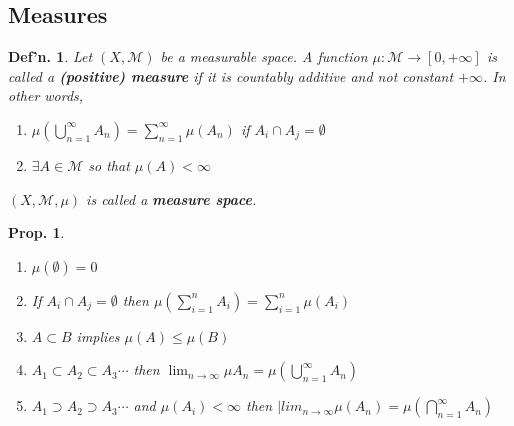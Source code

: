 \documentclass[12pt, a4paper]{book}
\newtheorem{definition}[theorem]{Def'n.}
\newtheorem{proposition}[theorem]{Prop.}
\theoremstyle{nonumberplain}
\begin{document}
\subsection{Measures}
\begin{definition}
    Let $(X,\mathcal{M})$ be a measurable space.
    A function $\mu:\mathcal{M}\to[0,+\infty]$ is called a \textbf{(positive) measure} if it is countably additive and not constant $+\infty$.
    In other words,
    \begin{enumerate}
        \item $\mu\left(\bigcup\limits_{n=1}^\infty A_n\right)=\sum\limits_{n=1}^\infty \mu(A_n)$ if $A_i\cap A_j=\emptyset$
        \item $\exists A\in\mathcal{M}$ so that $\mu(A)<\infty$
    \end{enumerate}
    $(X,\mathcal{M},\mu)$ is called a \textbf{measure space}.
\end{definition}
\begin{proposition}
    \begin{enumerate}[nolistsep]
        \item $\mu(\emptyset)=0$
        \item If $A_i\cap A_j=\emptyset$ then $\mu\left(\sum\limits_{i=1}^n A_i\right)=\sum\limits_{i=1}^n\mu(A_i)$
        \item $A\subset B$ implies $\mu(A)\leq\mu(B)$
        \item $A_1\subset A_2\subset A_3\cdots$ then $\lim_{n\to\infty}\mu A_n=\mu\left(\bigcup\limits_{n=1}^\infty A_n\right)$
        \item $A_1\supset A_2\supset A_3\cdots$ and $\mu(A_i)<\infty$ then $|lim_{n\to\infty}\mu(A_n)=\mu\left(\bigcap\limits_{n=1}^\infty A_n\right)$
    \end{enumerate}
\end{proposition}
\end{document}
